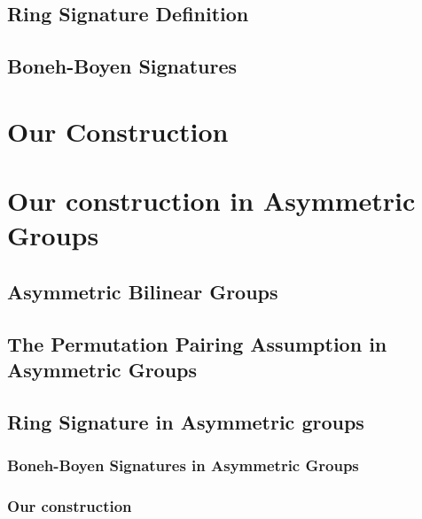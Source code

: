 \documentclass{llncs}
\begin{document}
                \subsection{Ring Signature Definition}
    
            

        \subsection{Boneh-Boyen Signatures} \label{sec:bbs}
    
            

    \section{Our Construction}
    
        



\appendix

\section{Our construction in Asymmetric Groups}

	

	\subsection{Asymmetric Bilinear Groups}
		

	\subsection{The Permutation Pairing Assumption in Asymmetric Groups} \label{sec:aPPA}
	
		


	\subsection{Ring Signature in Asymmetric groups}

		\subsubsection{Boneh-Boyen Signatures in Asymmetric Groups}

		

		\subsubsection{Our construction}

		
\end{document}
